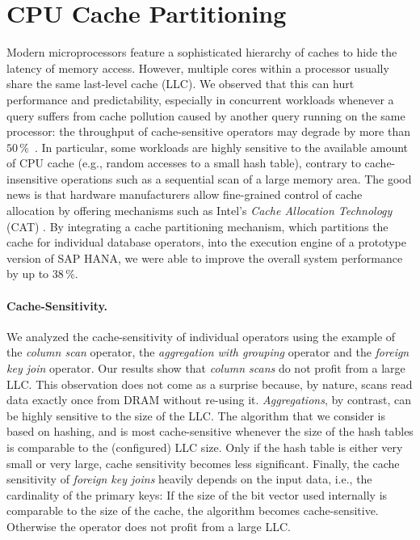\documentclass[11pt]{article}
\begin{document}
\section{CPU Cache Partitioning}
\label{nollhrm19:sec:cpu_cache_partitioning}

Modern microprocessors feature a sophisticated hierarchy of caches to hide the latency of memory access.
However, multiple cores within a processor usually share the same last-level cache (LLC).
We observed that this can hurt performance and predictability, especially in concurrent workloads whenever a query suffers from cache pollution caused by another query running on the same processor: the throughput of cache-sensitive operators may degrade by more than $50\,\mathrm{\%}$~\cite{nollhrm19:Noll:2018}.
In particular, some workloads are highly sensitive to the available amount of CPU cache (e.g., random accesses to a small hash table), contrary to cache-insensitive operations such as a sequential scan of a large memory area.
The good news is that hardware manufacturers allow fine-grained control of cache allocation by offering mechanisms such as Intel's \emph{Cache Allocation Technology} (CAT) \cite{nollhrm19:Intel:2015:CAT:whitepaper}.
By integrating a cache partitioning mechanism, which partitions the cache for individual database operators, into the execution engine of a prototype version of SAP HANA, we were able to improve the overall system performance by up to $38\,\mathrm{\%}$.

\paragraph*{Cache-Sensitivity.}
We analyzed the cache-sensitivity of individual operators using the example of the \emph{column scan} operator, the \emph{aggregation with grouping} operator and the \emph{foreign key join} operator. 
Our results show that \emph{column scans} do not profit from a large LLC.
This observation does not come as a surprise because, by nature, scans read data exactly once from DRAM without re-using it.
\emph{Aggregations}, by contrast, can be highly sensitive to the size of the LLC.
The algorithm that we consider is based on hashing, and is most cache-sensitive whenever the size of the hash tables is comparable to the (configured) LLC size.
Only if the hash table is either very small or very large, cache sensitivity becomes less significant.
Finally, the cache sensitivity of \emph{foreign key joins} heavily depends on the input data, i.e., the cardinality of the primary keys:
If the size of the bit vector used internally is comparable to the size of the cache, the algorithm becomes cache-sensitive.
Otherwise the operator does not profit from a large LLC.
\end{document}
